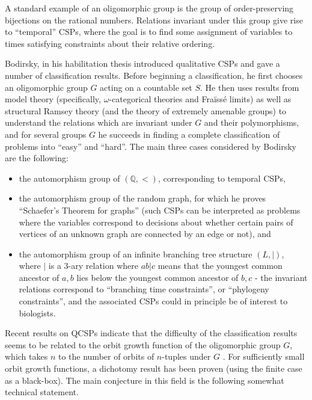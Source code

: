 \documentclass[letterpaper,11pt]{article}
\begin{document}
A standard example of an oligomorphic group is the group of order-preserving bijections on the rational numbers. Relations invariant under this group give rise to ``temporal'' CSPs, where the goal is to find some assignment of variables to times satisfying constraints about their relative ordering.

Bodirsky, in his habilitation thesis \cite{bodirsky-thesis} introduced qualitative CSPs and gave a number of classification results. Before beginning a classification, he first chooses an oligomorphic group $G$ acting on a countable set $S$. He then uses results from model theory (specifically, $\omega$-categorical theories and Fra\"iss\'e limits) as well as structural Ramsey theory (and the theory of extremely amenable groups) to understand the relations which are invariant under $G$ and their polymorphisms, and for several groups $G$ he succeeds in finding a complete classification of problems into ``easy'' and ``hard''. The main three cases considered by Bodirsky \cite{bodirsky-thesis} are the following:
\begin{itemize}
\item the automorphism group of $(\mathbb{Q},<)$, corresponding to temporal CSPs,

\item the automorphism group of the random graph, for which he proves ``Schaefer's Theorem for graphs'' (such CSPs can be interpreted as problems where the variables correspond to decisions about whether certain pairs of vertices of an unknown graph are connected by an edge or not), and

\item the automorphism group of an infinite branching tree structure $(L,|)$, where $|$ is a $3$-ary relation where $ab|c$ means that the youngest common ancestor of $a,b$ lies below the youngest common ancestor of $b,c$ - the invariant relations correspond to ``branching time constraints'', or ``phylogeny constraints'', and the associated CSPs could in principle be of interest to biologists.
\end{itemize}

Recent results on QCSPs indicate that the difficulty of the classification results seems to be related to the orbit growth function of the oligomorphic group $G$, which takes $n$ to the number of orbits of $n$-tuples under $G$ \cite{small-orbit-growth}. For sufficiently small orbit growth functions, a dichotomy result has been proven (using the finite case as a black-box). The main conjecture in this field is the following somewhat technical statement.
\end{document}
